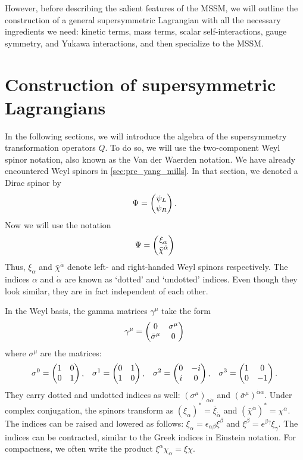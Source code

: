 However, before describing the salient features of the MSSM, we will outline the construction of a general supersymmetric Lagrangian with all the necessary ingredients we need: kinetic terms, mass terms, scalar self-interactions, gauge symmetry, and Yukawa interactions, and then specialize to the MSSM.

\section{Construction of supersymmetric Lagrangians}
In the following sections, we will introduce the algebra of the supersymmetry transformation operators $Q$. To do so, we will use the two-component Weyl spinor notation, also known as the Van der Waerden notation. We have already encountered Weyl spinors in \autoref{sec:pre_yang_mills}. In that section, we denoted a Dirac spinor by
\begin{equation*}
\Psi = \begin{pmatrix} \psi_L \\ \psi_R\end{pmatrix}.
\end{equation*}
Now we will use the notation
\begin{equation*}
  \Psi = \begin{pmatrix} \xi_\alpha \\ \bar{\chi}^{\dot{\alpha}}\end{pmatrix}
\end{equation*}
Thus, $\xi_\alpha$ and $\bar{\chi}^{\dot{\alpha}}$ denote left- and right-handed Weyl spinors respectively. The indices $\alpha$ and $\dot{\alpha}$ are known as `dotted' and `undotted' indices. Even though they look similar, they are in fact independent of each other.

In the Weyl basis, the gamma matrices $\gamma^\mu$ take the form
\begin{equation}
  \gamma^\mu = \begin{pmatrix} 0 & \sigma^\mu \\ \bar{\sigma}^\mu & 0\end{pmatrix}
\end{equation}
where $\sigma^\mu$ are the matrices:
\begin{align*}
\sigma^0 = \begin{pmatrix} 1 & 0 \\ 0 & 1\end{pmatrix}, && \sigma^1 = \begin{pmatrix} 0 & 1 \\ 1 & 0\end{pmatrix}, && \sigma^2 = \begin{pmatrix} 0 & -i \\ i & 0\end{pmatrix}, && \sigma^3 = \begin{pmatrix} 1 & 0 \\ 0 & -1\end{pmatrix}.
\end{align*}
They carry dotted and undotted indices as well: $(\sigma^\mu)_{\alpha\dot{\alpha}}$ and $(\bar{\sigma}^\mu)^{\dot{\alpha}\alpha}$. Under complex conjugation, the spinors transform as
$(\xi_\alpha)^* = \bar{\xi}_{\dot{\alpha}}$ and $(\bar{\chi}^{\dot{\alpha}})^* = \chi^{\alpha}$. The indices can be raised and lowered as follows: $\xi_\alpha = \epsilon_{\alpha\beta}\xi^\beta$ and $\xi^\beta = \epsilon^{\beta\gamma}\xi_\gamma$.
The indices can be contracted, similar to the Greek indices in Einstein notation. For compactness, we often write the product $\xi^\alpha\chi_\alpha = \xi\chi$.

